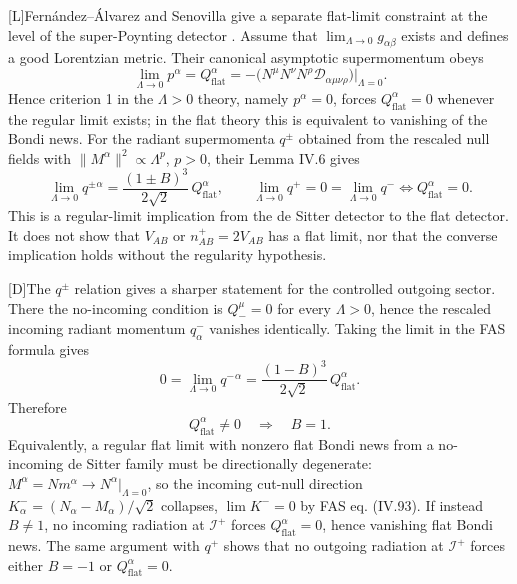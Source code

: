 \documentclass[11pt,a4paper]{article}
\newcommand{\scri}{\mathscr{I}}
\newcommand{\statusL}{\textsf{[L]}}
\newcommand{\statusD}{\textsf{[D]}}
\begin{document}
\statusL Fernández--Álvarez and Senovilla give a separate flat-limit constraint at the level of the super-Poynting detector \cite{fabSen2022asymptotic}.  Assume that \(\lim_{\Lambda\to0}g_{\alpha\beta}\) exists and defines a good Lorentzian metric.  Their canonical asymptotic supermomentum obeys
\begin{equation}
  \lim_{\Lambda\to0}p^\alpha
  =
  Q^\alpha_{\mathrm{flat}}
  =
  -\big(N^\mu N^\nu N^\rho \mathcal D_{\alpha\mu\nu\rho}\big)\big|_{\Lambda=0}.
\end{equation}
Hence criterion 1 in the \(\Lambda>0\) theory, namely \(p^\alpha=0\), forces \(Q^\alpha_{\mathrm{flat}}=0\) whenever the regular limit exists; in the flat theory this is equivalent to vanishing of the Bondi news.  For the radiant supermomenta \(q^\pm\) obtained from the rescaled null fields with \(\|M^\alpha\|^2\propto\Lambda^p\), \(p>0\), their Lemma IV.6 gives
\begin{equation}
  \lim_{\Lambda\to0}q^\pm{}^\alpha
  =
  \frac{(1\pm B)^3}{2\sqrt2}\,Q^\alpha_{\mathrm{flat}},
  \qquad
  \lim_{\Lambda\to0}q^+\!=0=\lim_{\Lambda\to0}q^-
  \iff
  Q^\alpha_{\mathrm{flat}}=0 .
\end{equation}
This is a regular-limit implication from the de Sitter detector to the flat detector.  It does not show that \(V_{AB}\) or \(n^+_{AB}=2V_{AB}\) has a flat limit, nor that the converse implication holds without the regularity hypothesis.

\statusD The \(q^\pm\) relation gives a sharper statement for the controlled outgoing sector.  There the no-incoming condition is \(Q_-^\mu=0\) for every \(\Lambda>0\), hence the rescaled incoming radiant momentum \(q^-_\alpha\) vanishes identically.  Taking the limit in the FAS formula gives
\begin{equation}\label{eq:flat-no-incoming-alternative}
  0
  =
  \lim_{\Lambda\to0}q^-{}^\alpha
  =
  \frac{(1-B)^3}{2\sqrt2}\,Q^\alpha_{\mathrm{flat}} .
\end{equation}
Therefore
\begin{equation}\label{eq:flat-degeneracy-dichotomy}
  Q^\alpha_{\mathrm{flat}}\neq0
  \quad\Longrightarrow\quad
  B=1 .
\end{equation}
Equivalently, a regular flat limit with nonzero flat Bondi news from a no-incoming de Sitter family must be directionally degenerate: \(M^\alpha=N m^\alpha\to N^\alpha|_{\Lambda=0}\), so the incoming cut-null direction \(K^-_\alpha=(N_\alpha-M_\alpha)/\sqrt2\) collapses, \(\lim K^-=0\) by FAS eq. (IV.93).  If instead \(B\neq1\), no incoming radiation at \(\scri^+\) forces \(Q^\alpha_{\mathrm{flat}}=0\), hence vanishing flat Bondi news.  The same argument with \(q^+\) shows that no outgoing radiation at \(\scri^+\) forces either \(B=-1\) or \(Q^\alpha_{\mathrm{flat}}=0\).
\end{document}
